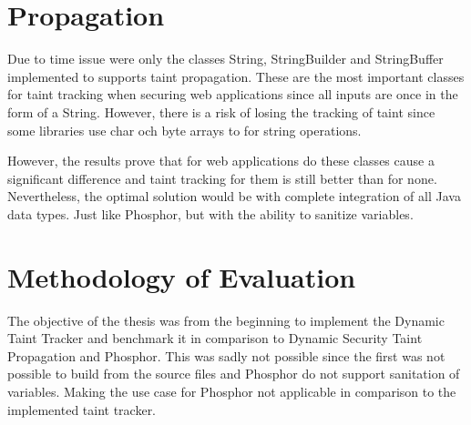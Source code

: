 \section{Propagation}
Due to time issue were only the classes String, StringBuilder and StringBuffer implemented to supports taint propagation. These are the most important classes for taint tracking when securing web applications since all inputs are once in the form of a String. However, there is a risk of losing the tracking of taint since some libraries use char och byte arrays to for string operations.

However, the results prove that for web applications do these classes cause a significant difference and taint tracking for them is still better than for none. Nevertheless, the optimal solution would be with complete integration of all Java data types. Just like Phosphor, but with the ability to sanitize variables.



\section{Methodology of Evaluation}
The objective of the thesis was from the beginning to implement the Dynamic Taint Tracker and benchmark it in comparison to Dynamic Security Taint Propagation and Phosphor. This was sadly not possible since the first was not possible to build from the source files and Phosphor do not support sanitation of variables. Making the use case for Phosphor not applicable in comparison to the implemented taint tracker. 